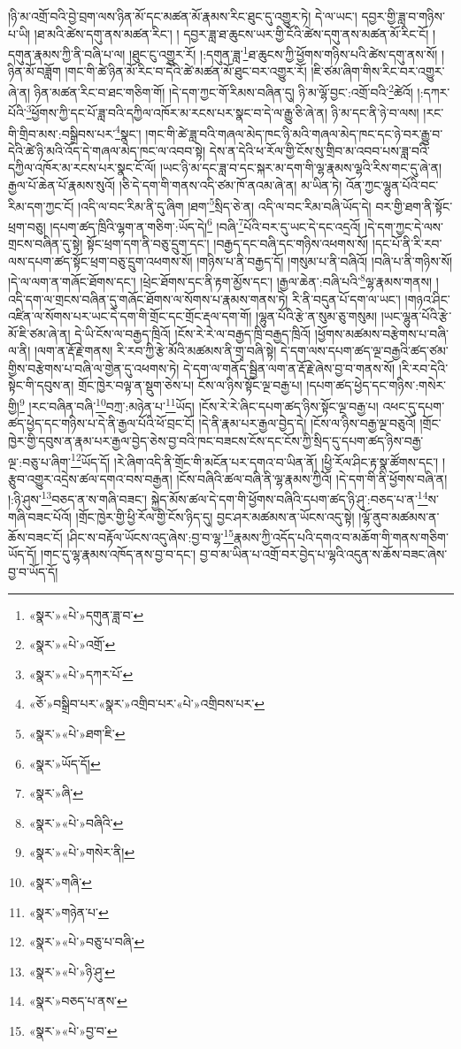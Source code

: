 །ཉི་མ་འགྲོ་བའི་བྱེ་བྲག་ལས་ཉིན་མོ་དང་མཚན་མོ་རྣམས་རིང་ཐུང་དུ་འགྱུར་ཏེ། དེ་ལ་ཡང་། དབྱར་གྱི་ཟླ་བ་གཉིས་པ་ཡི། །ཐ་མའི་ཚེས་དགུ་ནས་མཚན་རིང་། །
དབྱར་ཟླ་ཐ་ཆུངས་ཡར་གྱི་ངོའི་ཚེས་དགུ་ནས་མཚན་མོ་རིང་ངོ། །དགུན་རྣམས་ཀྱི་ནི་བཞི་པ་ལ། །ཐུང་ངུ་འགྱུར་རོ། །:དགུན་ཟླ་\footnote{«སྣར་»«པེ་»དགུན་ཟླ་བ་}ཐ་ཆུངས་ཀྱི་ཕྱོགས་གཉིས་པའི་ཚེས་དགུ་ནས་སོ། །ཉིན་མོ་བཟློག །གང་གི་ཚེ་ཉིན་མོ་རིང་བ་དེའི་ཚེ་མཚན་མོ་ཐུང་བར་འགྱུར་རོ། །ཇི་ཙམ་ཞིག་གིས་རིང་བར་འགྱུར་ཞེ་ན། ཉིན་མཚན་རིང་བ་ཐང་གཅིག་གོ། །དེ་དག་ཀྱང་གོ་རིམས་བཞིན་དུ། ཉི་མ་ལྷོ་བྱང་:འགྲོ་བའི་\footnote{«སྣར་»«པེ་»འགྲོ་}ཚེའོ། །:དཀར་པོའི་\footnote{«སྣར་»«པེ་»དཀར་པོ་}ཕྱོགས་ཀྱི་དང་པོ་ཟླ་བའི་དཀྱིལ་འཁོར་མ་རངས་པར་སྣང་བ་དེ་ལ་རྒྱུ་ཅི་ཞེ་ན། ཉི་མ་དང་ནི་ཉེ་བ་ལས། །རང་གི་གྲིབ་མས་:བསྒྲིབས་པར་\footnote{«ཅོ་»བསྒྲིབ་པར་«སྣར་»འགྲིབ་པར་«པེ་»འགྲིབས་པར་}སྣང་། །གང་གི་ཚེ་ཟླ་བའི་གཞལ་མེད་ཁང་ཉི་མའི་གཞལ་མེད་ཁང་དང་ཉེ་བར་རྒྱུ་བ་དེའི་ཚེ་ཉི་མའི་འོད་དེ་གཞལ་མེད་ཁང་ལ་འབབ་སྟེ། དེས་ན་དེའི་ཕ་རོལ་གྱི་ངོས་སུ་གྲིབ་མ་འབབ་པས་ཟླ་བའི་དཀྱིལ་འཁོར་མ་རངས་པར་སྣང་ངོ་ལོ། །ཡང་ཉི་མ་དང་ཟླ་བ་དང་སྐར་མ་དག་གི་ལྷ་རྣམས་ལྷའི་རིས་གང་དུ་ཞེ་ན། རྒྱལ་པོ་ཆེན་པོ་རྣམས་སུའོ། །ཅི་དེ་དག་གི་གནས་འདི་ཙམ་ཁོ་ནའམ་ཞེ་ན། མ་ཡིན་ཏེ། འོན་ཀྱང་ལྷུན་པོའི་བང་རིམ་དག་ཀྱང་ངོ། །འདི་ལ་བང་རིམ་ནི་དུ་ཞིག །ཐག་\footnote{«སྣར་»«པེ་»ཐག་ཇི་}སྲིད་ཅེ་ན། འདི་ལ་བང་རིམ་བཞི་ཡོད་དེ། བར་གྱི་ཐག་ནི་སྟོང་ཕྲག་བཅུ། །དཔག་ཚད་ཁྲིའི་ལྷག་ན་གཅིག་:ཡོད་དེ།\footnote{«སྣར་»ཡོད་དོ།} །བཞི་\footnote{«སྣར་»ཞི་}པོའི་བར་དུ་ཡང་དེ་དང་འདྲའོ། །དེ་དག་ཀྱང་དེ་ལས་གྲངས་བཞིན་དུ་སྟེ། སྟོང་ཕྲག་དག་ནི་བཅུ་དྲུག་དང་། །བརྒྱད་དང་བཞི་དང་གཉིས་འཕགས་སོ། །དང་པོ་ནི་རི་རབ་ལས་དཔག་ཚད་སྟོང་ཕྲག་བཅུ་དྲུག་འཕགས་སོ། །གཉིས་པ་ནི་བརྒྱད་དོ། །གསུམ་པ་ནི་བཞིའོ། །བཞི་པ་ནི་གཉིས་སོ། །དེ་ལ་ལག་ན་གཞོང་ཐོགས་དང་། །ཕྲེང་ཐོགས་དང་ནི་རྟག་མྱོས་དང་། །རྒྱལ་ཆེན་:བཞི་པའི་\footnote{«སྣར་»«པེ་»བཞིའི་}ལྷ་རྣམས་གནས། །འདི་དག་ལ་གྲངས་བཞིན་དུ་གཞོང་ཐོགས་ལ་སོགས་པ་རྣམས་གནས་ཏེ། རི་ནི་བདུན་པོ་དག་ལ་ཡང་། །གཉའ་ཤིང་འཛིན་ལ་སོགས་པར་ཡང་དེ་དག་གི་གྲོང་དང་གྲོང་རྡལ་དག་གོ། །ལྷུན་པོའི་རྩེ་ན་སུམ་ཅུ་གསུམ། །ཡང་ལྷུན་པོའི་རྩེ་མོ་ཇི་ཙམ་ཞེ་ན། དེ་ཡི་ངོས་ལ་བརྒྱད་ཁྲིའོ། །ངོས་རེ་རེ་ལ་བརྒྱད་ཁྲི་བརྒྱད་ཁྲིའོ། །ཕྱོགས་མཚམས་བརྩེགས་པ་བཞི་ལ་ནི། །ལག་ན་རྡོ་རྗེ་གནས། རི་རབ་ཀྱི་རྩེ་མོའི་མཚམས་ནི་གྲྭ་བཞི་སྟེ། དེ་དག་ལས་དཔག་ཚད་ལྔ་བརྒྱའི་ཚད་ཙམ་གྱིས་བརྩེགས་པ་བཞི་ལ་གྱེན་དུ་འཕགས་ཏེ། དེ་དག་ལ་གནོད་སྦྱིན་ལག་ན་རྡོ་རྗེ་ཞེས་བྱ་བ་གནས་སོ། །རི་རབ་དེའི་སྟེང་གི་དབུས་ན། གྲོང་ཁྱེར་བལྟ་ན་སྡུག་ཅེས་པ། ངོས་ལ་ཉིས་སྟོང་ལྔ་བརྒྱ་པ། །དཔག་ཚད་ཕྱེད་དང་གཉིས་:གསེར་གྱི།\footnote{«སྣར་»«པེ་»གསེར་ནི།} །རང་བཞིན་བཞི་\footnote{«སྣར་»གཞི་}བཀྲ་:མཉེན་པ་\footnote{«སྣར་»གཉེན་པ་}ཡོད། །ངོས་རེ་རེ་ཞིང་དཔག་ཚད་ཉིས་སྟོང་ལྔ་བརྒྱ་པ། འཕང་དུ་དཔག་ཚད་ཕྱེད་དང་གཉིས་པ་དེ་ནི་རྒྱལ་པོའི་ཕོ་བྲང་ངོ། །དེ་ནི་རྣམ་པར་རྒྱལ་བྱེད་དེ། །ངོས་ལ་ཉིས་བརྒྱ་ལྔ་བཅུའོ། །གྲོང་ཁྱེར་གྱི་དབུས་ན་རྣམ་པར་རྒྱལ་བྱེད་ཅེས་བྱ་བའི་ཁང་བཟངས་ངོས་དང་ངོས་ཀྱི་སྲིད་དུ་དཔག་ཚད་ཉིས་བརྒྱ་ལྔ་:བཅུ་པ་ཞིག་\footnote{«སྣར་»«པེ་»བཅུ་པ་བཞི་}ཡོད་དོ། །རེ་ཞིག་འདི་ནི་གྲོང་གི་མངོན་པར་དགའ་བ་ཡིན་ནོ། །ཕྱི་རོལ་ཤིང་རྟ་སྣ་ཚོགས་དང་། །རྩུབ་འགྱུར་འདྲེས་ཚལ་དགའ་བས་བརྒྱན། །ངོས་བཞིའི་ཚལ་བཞི་ནི་ལྷ་རྣམས་ཀྱིའོ། །དེ་དག་གི་ནི་ཕྱོགས་བཞི་ན། །:ཉི་ཤུས་\footnote{«སྣར་»«པེ་»ཉི་ཤུ་}བཅད་ན་ས་གཞི་བཟང་། སྐྱེད་མོས་ཚལ་དེ་དག་གི་ཕྱོགས་བཞིའི་དཔག་ཚད་ཉི་ཤུ་:བཅད་པ་ན་\footnote{«སྣར་»བཅད་པ་ནས་}ས་གཞི་བཟང་པོའོ། །གྲོང་ཁྱེར་གྱི་ཕྱི་རོལ་གྱི་ངོས་ཉིད་དུ། བྱང་ཤར་མཚམས་ན་ཡོངས་འདུ་སྟེ། །ལྷོ་ནུབ་མཚམས་ན་ཆོས་བཟང་ངོ། །ཤིང་ས་བརྟོལ་ཡོངས་འདུ་ཞེས་:བྱ་བ་ལྷ་\footnote{«སྣར་»«པེ་»བྱ་བ་}རྣམས་ཀྱི་འདོད་པའི་དགའ་བ་མཆོག་གི་གནས་གཅིག་ཡོད་དོ། །གང་དུ་ལྷ་རྣམས་འཁོད་ནས་བྱ་བ་དང་། བྱ་བ་མ་ཡིན་པ་འགྲོ་བར་བྱེད་པ་ལྷའི་འདུན་ས་ཆོས་བཟང་ཞེས་བྱ་བ་ཡོད་དོ། 